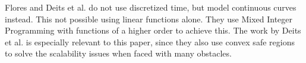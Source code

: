 Flores\cite{Flores2007} and Deits et al.\cite{Deits2015} do not use discretized time, but model continuous curves instead. This not possible using linear functions alone. They use Mixed Integer Programming with functions of a higher order to achieve this. The work by Deits et al. is especially relevant to this paper, since they also use convex safe regions to solve the scalability issues when faced with many obstacles.
